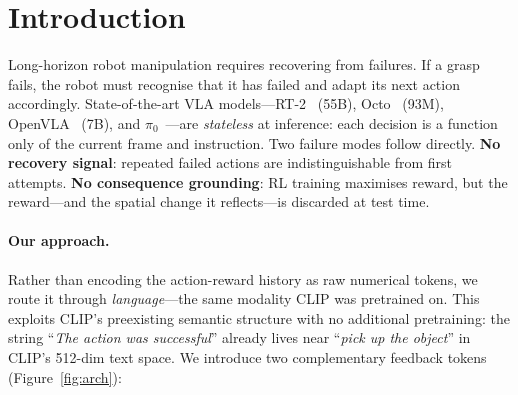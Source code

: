 \documentclass{article}
\newcommand{\modelname}{\textsc{TERM}\xspace}
\begin{document}
\begin{abstract}
for out-of-distribution visual domains, CLIP vision can optionally be
fine-tuned ($+86.2$M, Mode B) while keeping the text encoder frozen.
On Language-Table~\citep{lynch2023languagetable}
(3,000 real episodes from the official Google Research GCS dataset),
\modelname\ achieves $69.0\%\,(\pm0.8\%)$ validation accuracy versus
$68.3\%\,(\pm0.7\%)$ for a strong behavioural-cloning baseline---a
consistent $+0.65$\,pp gain across all three seeds---and six ablation
variants confirm that the full five-stream architecture outperforms
every partial configuration.
Full-convergence results across all 18 condition$\times$seed runs are
ongoing; the numbers reported here represent completed seeds from the
real-data training run.
The full nine-variant ablation study spanning both Language-Table and
CALVIN D$\to$D~\citep{mees2022calvin} is ongoing.
\end{abstract}


\section{Introduction}
\label{sec:intro}

Long-horizon robot manipulation requires recovering from failures.
If a grasp fails, the robot must recognise that it has failed and adapt
its next action accordingly.
State-of-the-art VLA models---RT-2~\citep{brohan2023rt2} (55B),
Octo~\citep{octo2024} (93M), OpenVLA~\citep{kim2024openvla} (7B),
and $\pi_0$~\citep{black2024pi0}---are \emph{stateless} at inference:
each decision is a function only of the current frame and instruction.
Two failure modes follow directly.
\textbf{No recovery signal}: repeated failed actions are
indistinguishable from first attempts.
\textbf{No consequence grounding}: RL training maximises reward, but the
reward---and the spatial change it reflects---is discarded at test time.

\paragraph{Our approach.}
Rather than encoding the action-reward history as raw numerical tokens, we
route it through \emph{language}---the same modality CLIP was pretrained
on.
This exploits CLIP's preexisting semantic structure with no additional
pretraining: the string ``\emph{The action was successful}'' already
lives near ``\emph{pick up the object}'' in CLIP's 512-dim text space.
We introduce two complementary feedback tokens (Figure~\ref{fig:arch}):
\end{document}
